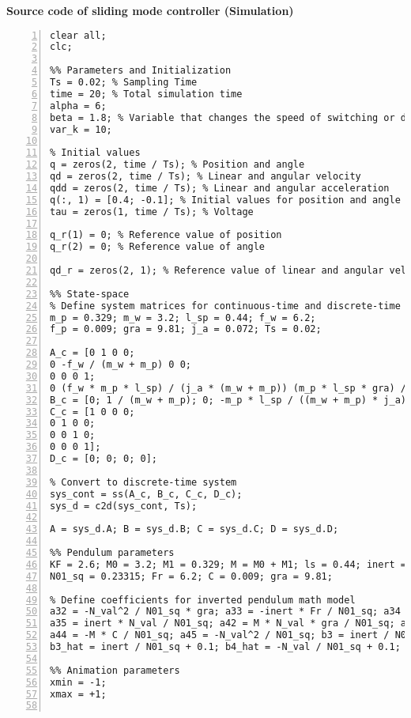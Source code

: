 \normalsize\bf{Source code of sliding mode controller (Simulation)}
\label{smcSim}
\vspace{1cm}
\begin{lstlisting}[numbers=left,basicstyle=\scriptsize,caption={Source code of sliding mode controller (Simulation).},captionpos=b]	
clear all;
clc;

%% Parameters and Initialization
Ts = 0.02; % Sampling Time
time = 20; % Total simulation time
alpha = 6;
beta = 1.8; % Variable that changes the speed of switching or duty cycle
var_k = 10;

% Initial values
q = zeros(2, time / Ts); % Position and angle
qd = zeros(2, time / Ts); % Linear and angular velocity
qdd = zeros(2, time / Ts); % Linear and angular acceleration
q(:, 1) = [0.4; -0.1]; % Initial values for position and angle
tau = zeros(1, time / Ts); % Voltage

q_r(1) = 0; % Reference value of position
q_r(2) = 0; % Reference value of angle

qd_r = zeros(2, 1); % Reference value of linear and angular velocity

%% State-space
% Define system matrices for continuous-time and discrete-time systems
m_p = 0.329; m_w = 3.2; l_sp = 0.44; f_w = 6.2;
f_p = 0.009; gra = 9.81; j_a = 0.072; Ts = 0.02;

A_c = [0 1 0 0;
0 -f_w / (m_w + m_p) 0 0;
0 0 0 1;
0 (f_w * m_p * l_sp) / (j_a * (m_w + m_p)) (m_p * l_sp * gra) / j_a -f_p / j_a];
B_c = [0; 1 / (m_w + m_p); 0; -m_p * l_sp / ((m_w + m_p) * j_a)];
C_c = [1 0 0 0;
0 1 0 0;
0 0 1 0;
0 0 0 1];
D_c = [0; 0; 0; 0];

% Convert to discrete-time system
sys_cont = ss(A_c, B_c, C_c, D_c);
sys_d = c2d(sys_cont, Ts);

A = sys_d.A; B = sys_d.B; C = sys_d.C; D = sys_d.D;

%% Pendulum parameters
KF = 2.6; M0 = 3.2; M1 = 0.329; M = M0 + M1; ls = 0.44; inert = 0.072; N_val = 0.1446;
N01_sq = 0.23315; Fr = 6.2; C = 0.009; gra = 9.81;

% Define coefficients for inverted pendulum math model
a32 = -N_val^2 / N01_sq * gra; a33 = -inert * Fr / N01_sq; a34 = N_val * C / N01_sq;
a35 = inert * N_val / N01_sq; a42 = M * N_val * gra / N01_sq; a43 = N_val * Fr / N01_sq;
a44 = -M * C / N01_sq; a45 = -N_val^2 / N01_sq; b3 = inert / N01_sq; b4 = -N_val / N01_sq;
b3_hat = inert / N01_sq + 0.1; b4_hat = -N_val / N01_sq + 0.1;

%% Animation parameters
xmin = -1;
xmax = +1;


\end{lstlisting}
